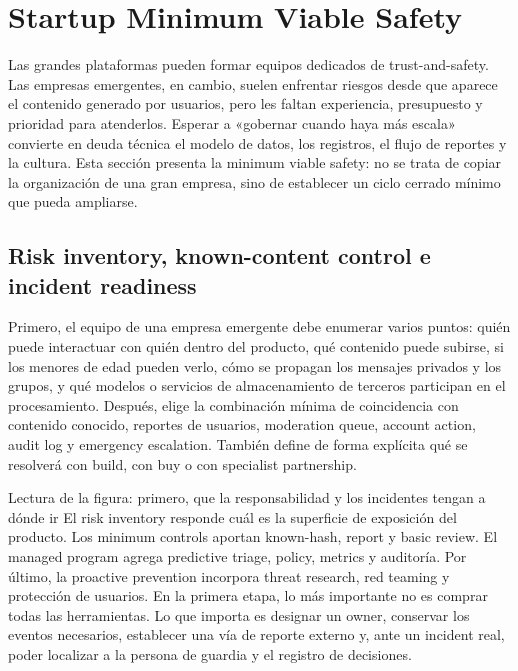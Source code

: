 \section{Startup Minimum Viable Safety}

Las grandes plataformas pueden formar equipos dedicados de trust-and-safety. Las empresas emergentes, en cambio, suelen enfrentar riesgos desde que aparece el contenido generado por usuarios, pero les faltan experiencia, presupuesto y prioridad para atenderlos. Esperar a «gobernar cuando haya más escala» convierte en deuda técnica el modelo de datos, los registros, el flujo de reportes y la cultura. Esta sección presenta la minimum viable safety: no se trata de copiar la organización de una gran empresa, sino de establecer un ciclo cerrado mínimo que pueda ampliarse.

\subsection{Risk inventory, known-content control e incident readiness}

Primero, el equipo de una empresa emergente debe enumerar varios puntos: quién puede interactuar con quién dentro del producto, qué contenido puede subirse, si los menores de edad pueden verlo, cómo se propagan los mensajes privados y los grupos, y qué modelos o servicios de almacenamiento de terceros participan en el procesamiento. Después, elige la combinación mínima de coincidencia con contenido conocido, reportes de usuarios, moderation queue, account action, audit log y emergency escalation. También define de forma explícita qué se resolverá con build, con buy o con specialist partnership.


\begin{knowledgebox}{Lectura de la figura: primero, que la responsabilidad y los incidentes tengan a dónde ir}
El risk inventory responde cuál es la superficie de exposición del producto. Los minimum controls aportan known-hash, report y basic review. El managed program agrega predictive triage, policy, metrics y auditoría. Por último, la proactive prevention incorpora threat research, red teaming y protección de usuarios. En la primera etapa, lo más importante no es comprar todas las herramientas. Lo que importa es designar un owner, conservar los eventos necesarios, establecer una vía de reporte externo y, ante un incident real, poder localizar a la persona de guardia y el registro de decisiones.
\end{knowledgebox}

